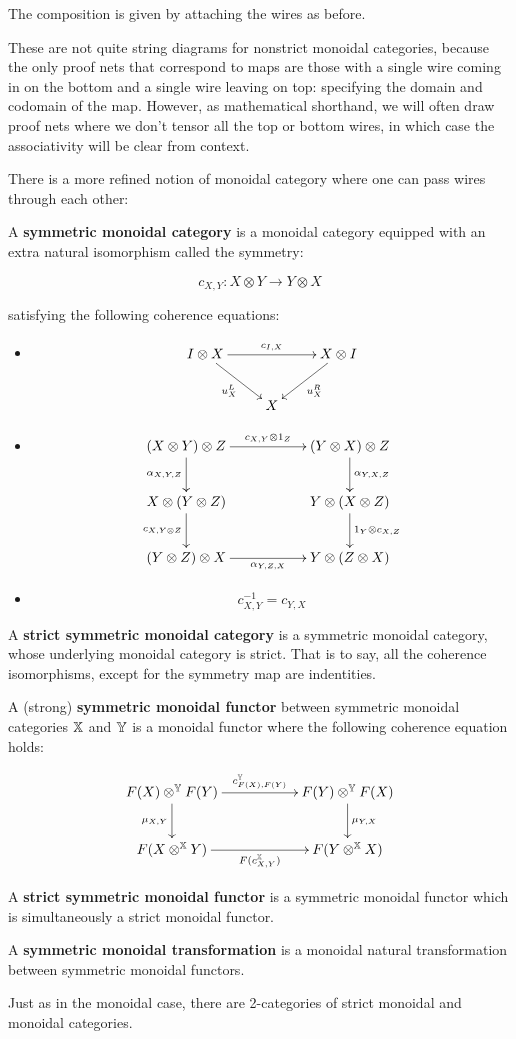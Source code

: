 The composition is given by attaching the wires as before.

These are not quite string diagrams for nonstrict monoidal categories, because the only proof nets that correspond to maps are those with a single wire coming in on the bottom and a single wire leaving on top: specifying the domain and codomain of the map.  However, as mathematical shorthand, we will often draw proof nets where we don't tensor all the top or bottom wires, in which case the associativity will be clear from context.


There is a more refined notion of monoidal category where one can pass wires through each other:

\begin{definition}
A {\bf symmetric monoidal category} is a monoidal category equipped with an extra natural isomorphism called the symmetry:

$$
c_{X,Y}:X\otimes Y \to Y\otimes X
$$

satisfying the following coherence equations:

\begin{itemize}
\item
$$
\xymatrix{
I \otimes X \ar[rr]^{c_{I,X}} \ar[rd]_{u^L_X} && X \otimes I \ar[ld]^{u^R_X} \\
& X &
}
$$

\item
$$
\xymatrix{
  (X\otimes Y)\otimes Z \ar[rr]^{c_{X,Y}\otimes 1_Z} \ar[d]_{\alpha_{X,Y,Z}}
    &
    &  (Y\otimes X)\otimes Z \ar[d]^{\alpha_{Y,X,Z}}
  \\X\otimes(Y\otimes Z) \ar[d]_{c_{X,Y\otimes Z}}
    &
    &  Y\otimes(X\otimes Z) \ar[d]^{1_Y\otimes c_{X,Z}}
  \\ (Y\otimes Z)\otimes X \ar[rr]_{\alpha_{Y,Z,X}}
    &
    & Y\otimes (Z\otimes X)
}
$$

\item
$$c_{X,Y}^{-1}= c_{Y,X}$$
\end{itemize}


A {\bf strict symmetric monoidal category} is a symmetric monoidal category, whose underlying monoidal category is strict. That is to say, all the coherence isomorphisms, except for the symmetry map are indentities.

A (strong) {\bf symmetric monoidal functor} between symmetric monoidal categories $\mathbb{X}$ and $\mathbb{Y}$ is a monoidal functor where the following coherence equation holds:

$$
\xymatrix{
  F(X)\otimes^\Y F(Y) \ar[rr]^{c_{F(X),F(Y)}^\Y} \ar[d]_{\mu_{X,Y}}
   && F(Y) \otimes^\Y F(X) \ar[d]^{\mu_{Y,X}}
\\F(X\otimes^\X Y) \ar[rr]_{F(c_{X,Y}^\X)}
 && F(Y \otimes^\X X)
}
$$


A {\bf strict symmetric monoidal functor} is a symmetric monoidal functor which is simultaneously a strict monoidal functor.

A {\bf symmetric monoidal transformation} is a monoidal natural transformation between symmetric monoidal functors.  


Just as in the monoidal case, there are 2-categories of strict monoidal and monoidal categories.
\end{definition}



